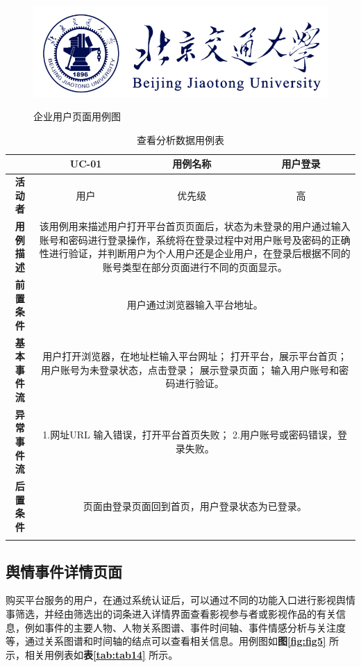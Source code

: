 \begin{figure}[!htb]
	\centering\label{fig:fig4}
	\includegraphics[scale=1]{image/logo1.png}
	\caption{企业用户页面用例图}
\end{figure}

\begin{longtable}[c]{c|ccc}
	\caption{查看分析数据用例表}
	\label{tab:tab13}\\
	\shline
	\multicolumn{1}{c|}{\textbf{用例编号}} & \multicolumn{1}{c|}{UC-01} & \multicolumn{1}{c|}{用例名称} &  用户登录\\ \hline
	\endhead
	\multicolumn{1}{c|}{\textbf{活动者}} & \multicolumn{1}{c|}{用户} & \multicolumn{1}{c|}{优先级} &高  \\ \hline
	\textbf{用例描述} & \multicolumn{3}{p{12cm}}{该用例用来描述用户打开平台首页页面后，状态为未登录的用户通过输入账号和密码进行登录操作，系统将在登录过程中对用户账号及密码的正确性进行验证，并判断用户为个人用户还是企业用户，在登录后根据不同的账号类型在部分页面进行不同的页面显示。} \\ \hline
	\textbf{前置条件}& \multicolumn{3}{p{12cm}}{用户通过浏览器输入平台地址。} \\ \hline
	\textbf{基本事件流}& \multicolumn{3}{p{12cm}}{用户打开浏览器，在地址栏输入平台网址；\newline
		打开平台，展示平台首页；\newline
		用户账号为未登录状态，点击登录；\newline
		展示登录页面；\newline
		输入用户账号和密码进行验证。} \\ \hline
	\textbf{异常事件流}& \multicolumn{3}{p{12cm}}{1.网址URL 输入错误，打开平台首页失败；\newline
		2.用户账号或密码错误，登录失败。
	} \\ \hline
	\textbf{后置条件}& \multicolumn{3}{p{12cm}}{页面由登录页面回到首页，用户登录状态为已登录。} \\ \shline
\end{longtable}

\subsection{舆情事件详情页面}
购买平台服务的用户，在通过系统认证后，可以通过不同的功能入口进行影视舆情事筛选，并经由筛选出的词条进入详情界面查看影视参与者或影视作品的有关信息，例如事件的主要人物、人物关系图谱、事件时间轴、事件情感分析与关注度等，通过关系图谱和时间轴的结点可以查看相关信息。用例图如\textbf{图\ref{fig:fig5}} 所示，相关用例表如\textbf{表\ref{tab:tab14}} 所示。

